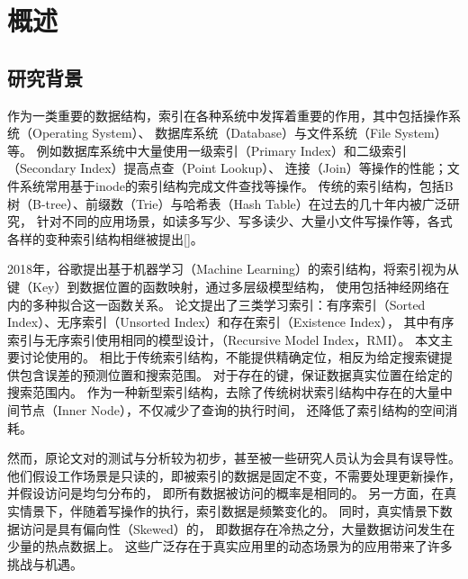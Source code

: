 
\chapter{概述}
\label{chap:intro}

\section{研究背景}

作为一类重要的数据结构，索引在各种系统中发挥着重要的作用，其中包括操作系统（Operating System）、
数据库系统（Database）与文件系统（File System）等。
例如数据库系统中大量使用一级索引（Primary Index）和二级索引（Secondary Index）提高点查（Point Lookup）、
连接（Join）等操作的性能；文件系统常用基于inode的索引结构完成文件查找等操作。
传统的索引结构，包括B树（B-tree）、前缀数（Trie）与哈希表（Hash Table）在过去的几〸年内被广泛研究，
针对不同的应用场景，如读多写少、写多读少、大量小文件写操作等，各式各样的变种索引结构相继被提出[]。

2018年，谷歌提出基于机器学习（Machine Learning）的索引结构\cite{kraska2018case}，将索引视为从键（Key）到数据位置的函数映射，通过多层级模型结构，
使用包括神经网络在内的多种{\model}拟合这一函数关系。
论文提出了三类学习索引：有序索引（Sorted Index）、无序索引（Unsorted Index）和存在索引（Existence Index），
其中有序索引与无序索引使用相同的模型设计，{\rmi}（Recursive Model Index，RMI）。
本文主要讨论使用{\rmi}的{\li}。
相比于传统索引结构，{\li}不能提供精确定位，相反{\li}为给定搜索键提供包含误差的预测位置和搜索范围。
对于存在的键，{\li}保证数据真实位置在给定的搜索范围内。
作为一种新型索引结构，{\li}去除了传统树状索引结构中存在的大量中间节点（Inner Node），不仅减少了查询的执行时间，
还降低了索引结构的空间消耗。

然而，原论文\cite{kraska2018case}对{\li}的测试与分析较为初步，甚至被一些研究人员认为会具有误导性\cite{throwalgo}。
他们假设工作场景是只读的，即被索引的数据是固定不变，{\li}不需要处理更新操作，并假设访问是均匀分布的，
即所有数据被访问的概率是相同的。
另一方面，在真实情景下，伴随着写操作的执行，索引数据是频繁变化的\cite{tpcc}。
同时，真实情景下数据访问是具有偏向性（Skewed）的\cite{zhang2016reducing, debrabant2013anti, eldawy2014trekking, levandoski2013identifying}，
即数据存在冷热之分，大量数据访问发生在少量的热点数据上。
这些广泛存在于真实应用里的动态场景为{\li}的应用带来了许多挑战与机遇。

